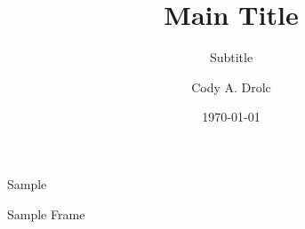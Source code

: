 \documentclass[12pt]{beamer}
\title[]{Main Title}
\subtitle{Subtitle}
\author[Drolc]{Cody A. Drolc} %
\institute[]{University of South Carolina} %
\date{\today} %
\begin{document}
	
	\frame{\titlepage} %
	
	\begin{frame}{Sample}
		\begin{center}
			Sample Frame
		\end{center}
	\end{frame}
	
\end{document}
